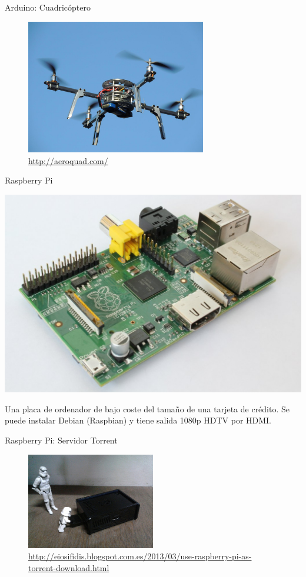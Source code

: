 \documentclass[14pt]{beamer}
\begin{document}
\begin{frame}{Arduino: Cuadricóptero}
  \begin{figure}
    \centering
    \includegraphics[width=0.7\textwidth]{pics/arduino-quadcopter.jpg}
    \caption*{\small \url{http://aeroquad.com/}}
  \end{figure}
\end{frame}

\begin{frame}{Raspberry Pi}
  \begin{center}
  \includegraphics[width=.45\textwidth]{pics/raspberry-pi.jpg}
  \end{center}
  \vspace{-0.5cm}
  \begin{block}{}\centering
    Una placa de ordenador de bajo coste del tamaño de una tarjeta de
    crédito. Se puede instalar Debian (Raspbian) y tiene salida 1080p
    HDTV por HDMI.
  \end{block}
\end{frame}

\begin{frame}{Raspberry Pi: Servidor Torrent}
  \begin{figure}
    \centering
    \includegraphics[width=0.5\textwidth]{pics/raspberry-pi-torrent-server.jpg}
    \caption*{\centering \small
      \url{http://eiosifidis.blogspot.com.es/2013/03/use-raspberry-pi-as-torrent-download.html}}
  \end{figure}
\end{frame}
\end{document}
